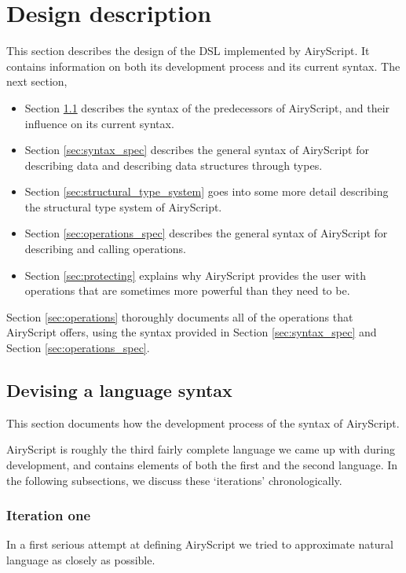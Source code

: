 \section{Design description}
This section describes the design of the DSL implemented by AiryScript. It
contains information on both its development process and its current syntax. The
next section, 
\begin{itemize}
  \item Section \ref{sec:devising_syntax} describes the syntax of the
    predecessors of AiryScript, and their influence on its current syntax.
%
  \item Section \ref{sec:syntax_spec} describes the general syntax of AiryScript
    for describing data and describing data structures through types.
%
  \item Section \ref{sec:structural_type_system} goes into some more detail
    describing the structural type system of AiryScript.
%
  \item Section \ref{sec:operations_spec} describes the general syntax of
    AiryScript for describing and calling operations.
%
  \item Section \ref{sec:protecting} explains why AiryScript provides the user
    with operations that are sometimes more powerful than they need to be.
\end{itemize}

\noindent
Section \ref{sec:operations} thoroughly documents all of the operations that
AiryScript offers, using the syntax provided in Section \ref{sec:syntax_spec}
and Section \ref{sec:operations_spec}.

\subsection{Devising a language syntax}
\label{sec:devising_syntax}
This section documents how the development process of the syntax of AiryScript.

AiryScript is roughly the third fairly complete language we came up with during
development, and contains elements of both the first and the second language. In
the following subsections, we discuss these ‘iterations’ chronologically.

\subsubsection{Iteration one}
In a first serious attempt at defining AiryScript we tried to approximate
natural language as closely as possible.

